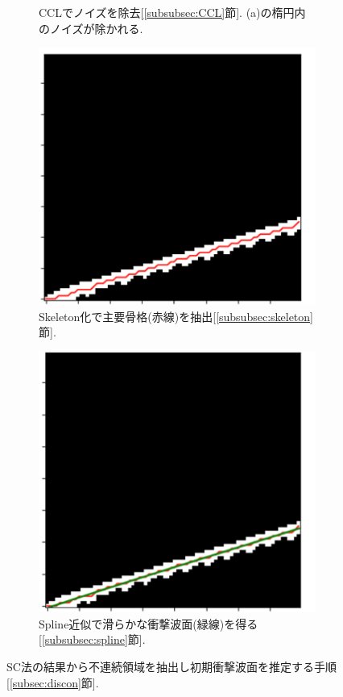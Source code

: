 \documentclass[a4j]{jarticle}
\begin{document}
\begin{figure}[H]
\begin{subfigure}[t]{0.23\textwidth}
    \caption{CCLでノイズを除去[\ref{subsubsec:CCL}節]. (a)の楕円内のノイズが除かれる.}
  \end{subfigure}
  \begin{subfigure}[t]{0.235\textwidth}
    \centering
    \includegraphics[width=\linewidth]{extractc.pdf}
    \caption{Skeleton化で主要骨格(赤線)を抽出[\ref{subsubsec:skeleton}節].}
  \end{subfigure}
  \hfill
  \begin{subfigure}[t]{0.23\textwidth}
    \centering
    \includegraphics[width=\linewidth]{extractd.pdf}
    \caption{Spline近似で滑らかな衝撃波面(緑線)を得る[\ref{subsubsec:spline}節].}
  \end{subfigure}

  \caption{SC法の結果から不連続領域を抽出し初期衝撃波面を推定する手順[\ref{subsec:discon}節].}
  \label{fig:extract}
\end{figure}
\end{document}
